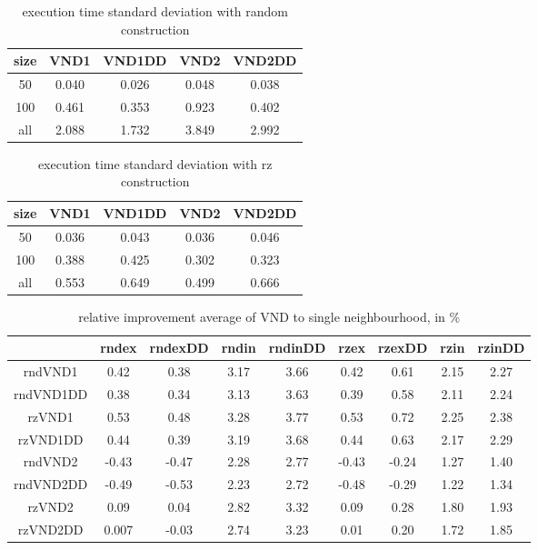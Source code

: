 \documentclass[12pt,a4paper]{article}
\begin{document}
\begin{table}[!h]
\centering
\begin{tabular}{|*{5}{c|}}
  \hline
  size & VND1 & VND1DD & VND2 & VND2DD\\
  \hline
  50 & 0.040 & 0.026 & 0.048 & 0.038 \\ %
  100 & 0.461 & 0.353 & 0.923 & 0.402 \\ %
  all & 2.088 & 1.732 & 3.849 & 2.992 \\ %
  \hline
\end{tabular}
\caption{execution time standard deviation with random construction}
\label{execution time of VND with random construction sd}
\end{table}

\begin{table}[!h]
\centering
\begin{tabular}{|*{5}{c|}}
  \hline
  size & VND1 & VND1DD & VND2 & VND2DD\\
  \hline
  50 & 0.036 & 0.043 & 0.036 & 0.046 \\ %
  100 & 0.388 & 0.425 & 0.302 & 0.323 \\ %
  all & 0.553 & 0.649 & 0.499 & 0.666 \\ %
  \hline
\end{tabular}
\caption{execution time standard deviation with rz construction}
\label{execution time of VND with rz construction sd}
\end{table}


\begin{table}[!h]
\centering
\begin{tabular}{|*{9}{c|}}
  \hline
   & rndex & rndexDD & rndin & rndinDD & rzex & rzexDD & rzin & rzinDD \\
  \hline
  rndVND1 & 0.42 & 0.38 & 3.17 & 3.66 & 0.42 & 0.61 & 2.15 & 2.27 \\
  rndVND1DD & 0.38 & 0.34 & 3.13 & 3.63 & 0.39 & 0.58 & 2.11 & 2.24 \\
  rzVND1 & 0.53 & 0.48 & 3.28 & 3.77 & 0.53 & 0.72 & 2.25 & 2.38 \\
  rzVND1DD & 0.44 & 0.39 & 3.19 & 3.68 & 0.44 & 0.63 & 2.17 & 2.29 \\
  rndVND2 & -0.43 & -0.47 & 2.28 & 2.77 & -0.43 & -0.24 & 1.27 & 1.40 \\
  rndVND2DD & -0.49 & -0.53 & 2.23 & 2.72 & -0.48 & -0.29 & 1.22 & 1.34 \\
  rzVND2 & 0.09 & 0.04 & 2.82 & 3.32 & 0.09 & 0.28 & 1.80 & 1.93 \\
  rzVND2DD & 0.007 & -0.03 & 2.74 & 3.23 & 0.01 & 0.20 & 1.72 & 1.85 \\
  \hline
\end{tabular}
\caption{relative improvement average of VND to single neighbourhood, in \%}
\label{relative improvement average of VND to single neighbourhood}
\end{table}
\end{document}
